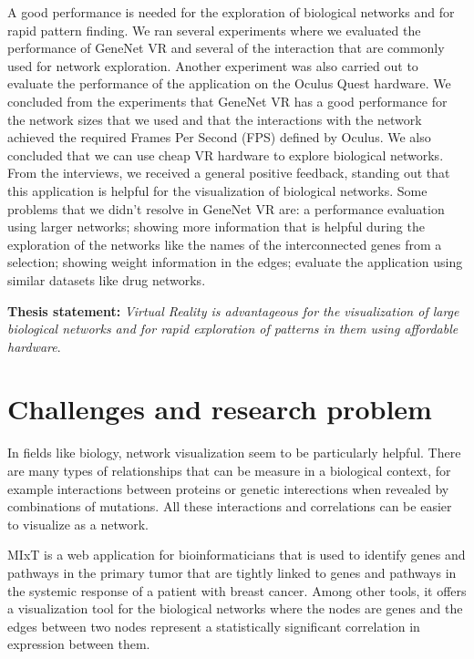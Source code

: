 A good performance is needed for the exploration of biological networks and for rapid pattern finding. We ran several experiments where we evaluated the performance of GeneNet VR and several of the interaction that are commonly used for network exploration. Another experiment was also carried out to evaluate the performance of the application on the Oculus Quest hardware. We concluded from the experiments that GeneNet VR has a good performance for the network sizes that we used and that the interactions with the network achieved the required Frames Per Second (FPS) defined by Oculus. We also concluded that we can use cheap VR hardware to explore biological networks. From the interviews, we received a general positive feedback, standing out that this application is helpful for the visualization of biological networks. Some problems that we didn't resolve in GeneNet VR are: a performance evaluation using larger networks; showing more information that is helpful during the exploration of the networks like the names of the interconnected genes from a selection; showing weight information in the edges; evaluate the application using similar datasets like drug networks.

\textbf{Thesis statement: } \emph{Virtual Reality is advantageous for the visualization of large biological networks and for rapid exploration of patterns in them using affordable hardware}.

\section{Challenges and research problem}

In fields like biology, network visualization seem to be particularly helpful\cite{pujana_network_modeling}\cite{fraser_view_function}. There are many types of relationships that can be measure in a biological context, for example interactions between proteins or genetic interections when revealed by combinations of mutations. All these interactions and correlations can be easier to visualize as a network\cite{merico_visualization}.

MIxT\cite{fjukstad_dumeaux_olsen_lund_hallett_bongo_2017} is a web application for bioinformaticians that is used to identify genes and pathways in the primary tumor that are tightly linked to genes and pathways in the systemic response of a patient with breast cancer\cite{dumeaux_fjukstad_interactions_tumor_blood}. Among other tools, it offers a visualization tool for the biological networks where the nodes are genes and the edges between two nodes represent a statistically significant correlation in expression between them.

